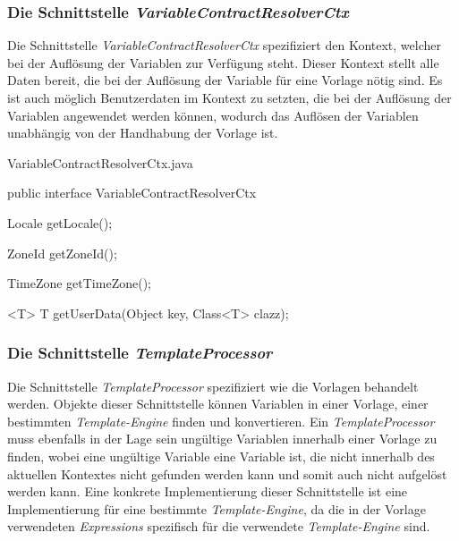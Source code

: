 \subsubsection{Die Schnittstelle \emph{VariableContractResolverCtx}}
\label{sec:variableResolverFactoryProvider}
Die Schnittstelle \emph{VariableContractResolverCtx} spezifiziert den Kontext, welcher bei der Auflösung der Variablen zur Verfügung steht. Dieser Kontext stellt alle Daten bereit, die bei der Auflösung der Variable für eine Vorlage nötig sind. Es ist auch möglich Benutzerdaten im Kontext zu setzten, die bei der Auflösung der Variablen angewendet werden können, wodurch das Auflösen der Variablen unabhängig von der Handhabung der Vorlage ist.

\begin{program}[h]
\caption{VariableContractResolverCtx.java}
\label{prog:variableContractResolverCtx}
\begin{JavaCode}
public interface VariableContractResolverCtx {

    Locale getLocale();

    ZoneId getZoneId();

    TimeZone getTimeZone();

    <T> T getUserData(Object key,
                      Class<T> clazz);
}
\end{JavaCode}
\end{program}

\subsubsection{Die Schnittstelle \emph{TemplateProcessor}}
\label{sec:templateProcessor}
Die Schnittstelle \emph{TemplateProcessor} spezifiziert wie die Vorlagen behandelt werden. Objekte dieser Schnittstelle können Variablen in einer Vorlage, einer bestimmten \emph{Template-Engine} finden und konvertieren. Ein \emph{TemplateProcessor} muss ebenfalls in der Lage sein ungültige Variablen innerhalb einer Vorlage zu finden, wobei eine ungültige Variable eine Variable ist, die nicht innerhalb des aktuellen Kontextes nicht gefunden werden kann und somit auch nicht aufgelöst werden kann.
\newline
\newline
Eine konkrete Implementierung dieser Schnittstelle ist eine Implementierung für eine bestimmte \emph{Template-Engine}, da die in der Vorlage verwendeten \emph{Expressions} spezifisch für die verwendete \emph{Template-Engine} sind.
\newline 

